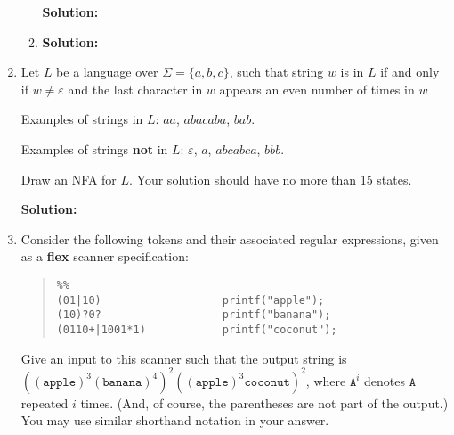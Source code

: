 \documentclass[11pt]{article}
\renewcommand{\epsilon}{\varepsilon}
\begin{document}
\begin{enumerate}
\begin{enumerate}
    \textbf{Solution:}
    
    \item {}

    \textbf{Solution:}
\end{enumerate}

\newpage

\item Let $L$ be a language over $\Sigma = \{a, b, c\}$, such that string $w$ is in $L$ if and only if $w\neq\epsilon$ and the last character in $w$ appears an even number of times in $w$

Examples of strings in $L$: $aa$, $abacaba$, $bab$.

Examples of strings \textbf{not} in $L$: $\epsilon$, $a$, $abcabca$, $bbb$.

Draw an NFA for $L$.  Your solution should have no more than 15 states.

\textbf{Solution:}

\newpage

\item Consider the following tokens and their associated regular expressions, given as a \textbf{flex} scanner specification:
\begin{quote}
\begin{lstlisting}
%%
(01|10)                   printf("apple");
(10)?0?                   printf("banana");
(0110+|1001*1)            printf("coconut");
\end{lstlisting}
\end{quote}
Give an input to this scanner such that the output string is $((\mathtt{apple})^3 (\mathtt{banana})^4)^2 ((\mathtt{apple})^3\mathtt{coconut})^2$, where $\mathtt{A}^i$ denotes $\mathtt{A}$ repeated $i$ times.   (And, of course, the parentheses are not part of the output.)  You may use similar shorthand notation in your answer.


\end{enumerate}
\end{document}
